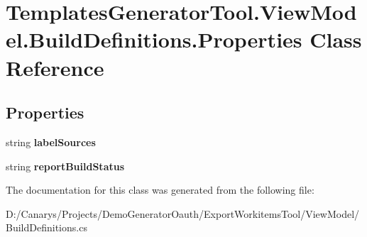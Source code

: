 \hypertarget{class_templates_generator_tool_1_1_view_model_1_1_build_definitions_1_1_properties}{}\section{Templates\+Generator\+Tool.\+View\+Model.\+Build\+Definitions.\+Properties Class Reference}
\label{class_templates_generator_tool_1_1_view_model_1_1_build_definitions_1_1_properties}
\subsection*{Properties}
\begin{DoxyCompactItemize}
\item 
\mbox{\label{class_templates_generator_tool_1_1_view_model_1_1_build_definitions_1_1_properties_ac736556fda7995d04ec2ea56ac9c7586}} 
string {\bfseries label\+Sources}
\item 
\mbox{\label{class_templates_generator_tool_1_1_view_model_1_1_build_definitions_1_1_properties_ad828cfcd2691ba9cbe3f677e0e8fece0}} 
string {\bfseries report\+Build\+Status}
\end{DoxyCompactItemize}


The documentation for this class was generated from the following file\+:\begin{DoxyCompactItemize}
\item 
D\+:/\+Canarys/\+Projects/\+Demo\+Generator\+Oauth/\+Export\+Workitems\+Tool/\+View\+Model/Build\+Definitions.\+cs\end{DoxyCompactItemize}
